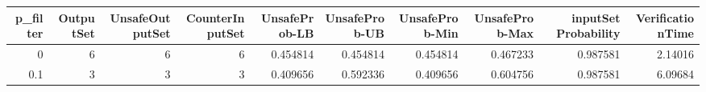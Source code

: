 \begin{tabular}{rrrrrrrrrr}
\hline
   p\_filter &   OutputSet &   UnsafeOutputSet &   CounterInputSet &   UnsafeProb-LB &   UnsafeProb-UB &   UnsafeProb-Min &   UnsafeProb-Max &   inputSet Probability &   VerificationTime \\
\hline
        0   &           6 &                 6 &                 6 &        0.454814 &        0.454814 &         0.454814 &         0.467233 &               0.987581 &            2.14016 \\
        0.1 &           3 &                 3 &                 3 &        0.409656 &        0.592336 &         0.409656 &         0.604756 &               0.987581 &            6.09684 \\
\hline
\end{tabular}
